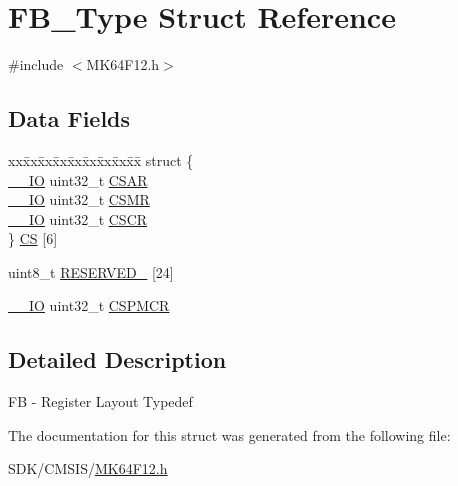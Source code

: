 \hypertarget{struct_f_b___type}{}\section{F\+B\+\_\+\+Type Struct Reference}
\label{struct_f_b___type}


{\ttfamily \#include $<$M\+K64\+F12.\+h$>$}

\subsection*{Data Fields}
\begin{DoxyCompactItemize}
\item 
\begin{tabbing}
xx\=xx\=xx\=xx\=xx\=xx\=xx\=xx\=xx\=\kill
struct \{\\
\>\mbox{\hyperlink{core__cm4_8h_aec43007d9998a0a0e01faede4133d6be}{\_\_IO}} uint32\_t \mbox{\hyperlink{group___v_r_e_f___peripheral___access___layer_gaf9ab99d74989193a551ecdde079dc3dd}{CSAR}}\\
\>\mbox{\hyperlink{core__cm4_8h_aec43007d9998a0a0e01faede4133d6be}{\_\_IO}} uint32\_t \mbox{\hyperlink{group___v_r_e_f___peripheral___access___layer_gaa3996f8519c6ea0bc401efe7c8c3a09d}{CSMR}}\\
\>\mbox{\hyperlink{core__cm4_8h_aec43007d9998a0a0e01faede4133d6be}{\_\_IO}} uint32\_t \mbox{\hyperlink{group___v_r_e_f___peripheral___access___layer_ga0fec501e836e61f4357f33451b5846c3}{CSCR}}\\
\} \mbox{\hyperlink{group___v_r_e_f___peripheral___access___layer_ga9f248450f93c158815963e3e97e729c8}{CS}} \mbox{[}6\mbox{]}\\

\end{tabbing}\item 
uint8\+\_\+t \mbox{\hyperlink{group___v_r_e_f___peripheral___access___layer_ga33a1c574e559dc57bb2fc28166bf6341}{R\+E\+S\+E\+R\+V\+E\+D\+\_}} \mbox{[}24\mbox{]}
\item 
\mbox{\hyperlink{core__cm4_8h_aec43007d9998a0a0e01faede4133d6be}{\+\_\+\+\_\+\+IO}} uint32\+\_\+t \mbox{\hyperlink{group___v_r_e_f___peripheral___access___layer_gac46ac81d2f5d1aa197ef7c23314710af}{C\+S\+P\+M\+CR}}
\end{DoxyCompactItemize}


\subsection{Detailed Description}
FB -\/ Register Layout Typedef 

The documentation for this struct was generated from the following file\+:\begin{DoxyCompactItemize}
\item 
S\+D\+K/\+C\+M\+S\+I\+S/\mbox{\hyperlink{_m_k64_f12_8h}{M\+K64\+F12.\+h}}\end{DoxyCompactItemize}
